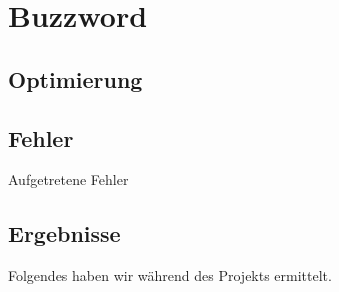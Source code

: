 \section{Buzzword}
\subsection{Optimierung}
\subsection{Fehler}
Aufgetretene Fehler
\subsection{Ergebnisse}%
Folgendes haben wir während des Projekts ermittelt.%